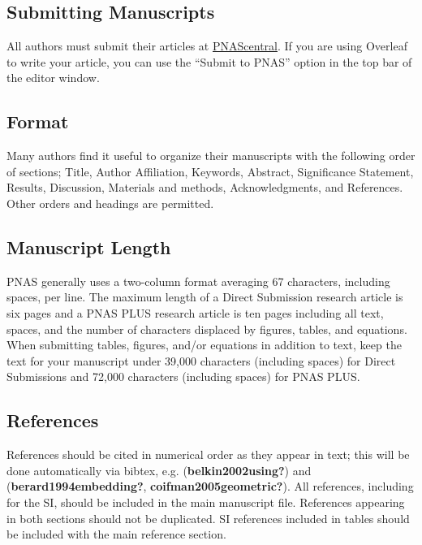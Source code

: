 \documentclass[9pt,twocolumn,twoside,]{pnas-new}
\begin{document}
\hypertarget{submitting-manuscripts}{%
\subsection*{Submitting Manuscripts}\label{submitting-manuscripts}}

All authors must submit their articles at
\href{http://www.pnascentral.org/cgi-bin/main.plex}{PNAScentral}. If you
are using Overleaf to write your article, you can use the ``Submit to
PNAS'' option in the top bar of the editor window.

\hypertarget{format}{%
\subsection*{Format}\label{format}}

Many authors find it useful to organize their manuscripts with the
following order of sections; Title, Author Affiliation, Keywords,
Abstract, Significance Statement, Results, Discussion, Materials and
methods, Acknowledgments, and References. Other orders and headings are
permitted.

\hypertarget{manuscript-length}{%
\subsection*{Manuscript Length}\label{manuscript-length}}

PNAS generally uses a two-column format averaging 67 characters,
including spaces, per line. The maximum length of a Direct Submission
research article is six pages and a PNAS PLUS research article is ten
pages including all text, spaces, and the number of characters displaced
by figures, tables, and equations. When submitting tables, figures,
and/or equations in addition to text, keep the text for your manuscript
under 39,000 characters (including spaces) for Direct Submissions and
72,000 characters (including spaces) for PNAS PLUS.

\hypertarget{references}{%
\subsection*{References}\label{references}}

References should be cited in numerical order as they appear in text;
this will be done automatically via bibtex, e.g.
(\textbf{belkin2002using?}) and (\textbf{berard1994embedding?},
\textbf{coifman2005geometric?}). All references, including for the SI,
should be included in the main manuscript file. References appearing in
both sections should not be duplicated. SI references included in tables
should be included with the main reference section.
\end{document}
